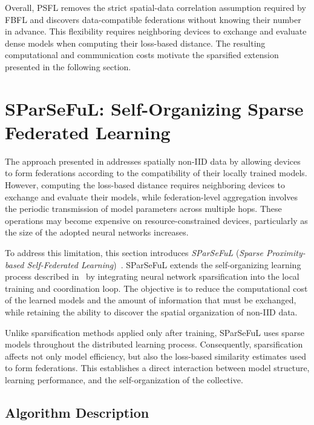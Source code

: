 Overall, \gls{PSFL} removes the strict spatial-data correlation assumption
required by \gls{FBFL} and discovers data-compatible federations without knowing
their number in advance.
%
This flexibility requires neighboring devices to exchange and evaluate dense
models when computing their loss-based distance.
%
The resulting computational and communication costs motivate the sparsified
extension presented in the following section.


\section{SParSeFuL: Self-Organizing Sparse Federated Learning}
\label{sec:sparseful}

The approach presented in  addresses spatially non-IID data by
 allowing devices to form federations according to the compatibility of their
 locally trained models.
%
However, 
 computing the loss-based distance requires neighboring devices to
 exchange and evaluate their models, while federation-level aggregation involves
 the periodic transmission of model parameters across multiple hops.
%
These operations may become expensive on resource-constrained devices,
 particularly as the size of the adopted neural networks increases.

To address this limitation, this section introduces
 \emph{SParSeFuL} (\emph{Sparse Proximity-based Self-Federated 
 Learning})~\cite{DBLP:conf/ijcnn/DominiEACZLV25,domini2026sparseful}.
%
SParSeFuL extends the self-organizing learning process described in~ 
 by integrating neural network sparsification into the 
 local training and coordination loop.
%
The objective is to reduce the computational cost of the learned models 
 and the amount of information that must be exchanged, 
 while retaining the ability to discover the spatial organization of non-IID data.

Unlike sparsification methods applied only after training, 
 SParSeFuL uses sparse models throughout the distributed learning process.
%
Consequently, 
 sparsification affects not only model efficiency, 
 but also the loss-based similarity estimates used to form federations.
%
This establishes a direct interaction between model structure, learning performance, 
 and the self-organization of the collective.

\subsection{Algorithm Description}
\label{sec:sparseful-algorithm}

